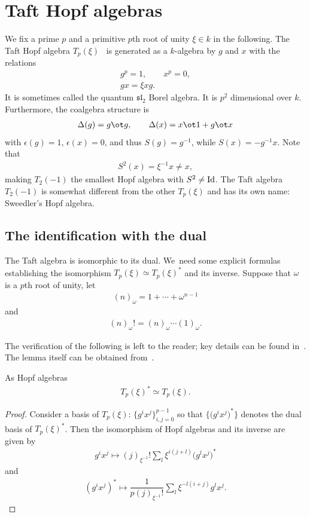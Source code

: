\section{Taft Hopf algebras}\label{sec:blah}
We fix a prime $p$ and a primitive $p$th root of unity $\xi\in k$ in the following. The Taft Hopf algebra $T_p(\xi)$~\cite{taft} is generated as a $k$-algebra by $g$ and $x$ with the relations \begin{gather}
g^p=1,\qquad
x^p=0,
\\
gx=\xi xg.
\end{gather}
It is sometimes called the quantum ${\mathfrak{sl}}_2$ Borel algebra. It is $p^2$ dimensional over $k$. Furthermore, the coalgebra structure is
\begin{gather}
\Delta(g)=g\ot g,\qquad \Delta(x)=x\ot 1+g\ot x
\end{gather}
with $\epsilon(g)=1$, $\epsilon(x)=0$, and thus $S(g)=g^{-1}$, while $S(x)=-g^{-1}x$. Note that
\begin{gather}
S^2(x)=\xi^{-1}x\neq x,
\end{gather}
making $T_2(-1)$ the smallest Hopf algebra with $S^2\neq {\rm Id}$. The Taft algebra $T_2(-1)$ is somewhat different from the other $T_p(\xi)$ and has its own name: Sweedler’s Hopf algebra.

\subsection{The identification with the dual}
The Taft algebra is isomorphic to its dual. We~need some explicit formulas establishing the isomorphism $T_p(\xi)\simeq T_p(\xi)^*$ and its inverse. Suppose that $\omega$ is a $p$th root of unity, let
\begin{gather}
(n)_\omega=1+\cdots +\omega^{n-1}
\end{gather}
and
\begin{gather}
(n)_\omega !=(n)_\omega\cdots(1)_\omega.
\end{gather}

The verification of the following is left to the reader; key details can be found in~\cite{selfdual}. The lemma itself can be obtained from~\cite{nen}.
\begin{Lemma}\label{nenlem}
 As Hopf algebras
 \begin{gather}
 T_p(\xi)^*\simeq T_p(\xi).
 \end{gather}
\end{Lemma}
\begin{proof}
Consider a basis of $T_p(\xi)$: $\big\{g^ix^j\big\}_{ i,j=0}^{p-1}$ so that $\big\{\big(g^ix^j\big)^*\big\}$ denotes the dual basis of $T_p(\xi)^*$. Then the isomorphism of Hopf algebras and its inverse are given by
\begin{gather}
g^ix^j\mapsto(j)_{\xi^{-1}}!\sum_l\xi^{i(j+l)}\big(g^lx^j\big)^*
\end{gather}
and
\begin{gather}
(g^ix^j)^*\mapsto\dfrac{1}{p(j)_{\xi^{-1}}!}\sum_l\xi^{-l(i+j)}g^lx^j.
\end{gather}
\end{proof}

